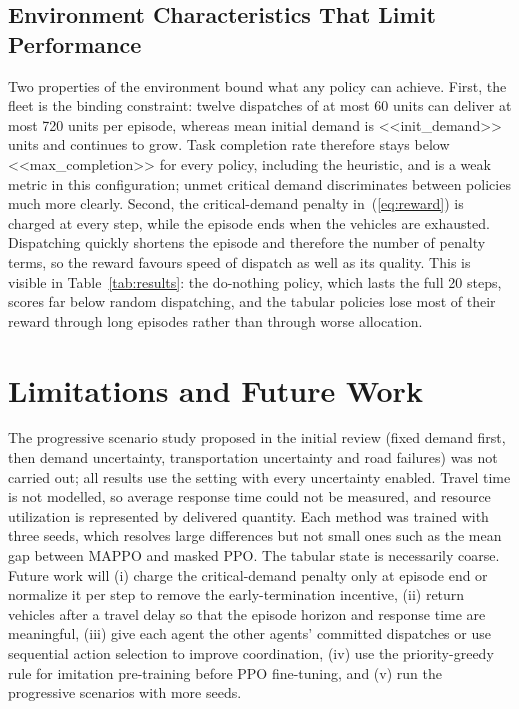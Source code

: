 \documentclass[conference]{IEEEtran}
\begin{document}
\subsection{Environment Characteristics That Limit Performance}
\label{sec:envlimits}
Two properties of the environment bound what any policy can achieve. First, the fleet is the binding constraint: twelve dispatches of at most 60 units can deliver at most 720 units per episode, whereas mean initial demand is <<init_demand>> units and continues to grow. Task completion rate therefore stays below <<max_completion>> for every policy, including the heuristic, and is a weak metric in this configuration; unmet critical demand discriminates between policies much more clearly. Second, the critical-demand penalty in~(\ref{eq:reward}) is charged at every step, while the episode ends when the vehicles are exhausted. Dispatching quickly shortens the episode and therefore the number of penalty terms, so the reward favours speed of dispatch as well as its quality. This is visible in Table~\ref{tab:results}: the do-nothing policy, which lasts the full 20 steps, scores far below random dispatching, and the tabular policies lose most of their reward through long episodes rather than through worse allocation.

\section{Limitations and Future Work}
The progressive scenario study proposed in the initial review (fixed demand first, then demand uncertainty, transportation uncertainty and road failures) was not carried out; all results use the setting with every uncertainty enabled. Travel time is not modelled, so average response time could not be measured, and resource utilization is represented by delivered quantity. Each method was trained with three seeds, which resolves large differences but not small ones such as the mean gap between MAPPO and masked PPO. The tabular state is necessarily coarse. Future work will (i) charge the critical-demand penalty only at episode end or normalize it per step to remove the early-termination incentive, (ii) return vehicles after a travel delay so that the episode horizon and response time are meaningful, (iii) give each agent the other agents' committed dispatches or use sequential action selection to improve coordination, (iv) use the priority-greedy rule for imitation pre-training before PPO fine-tuning, and (v) run the progressive scenarios with more seeds.
\end{document}
